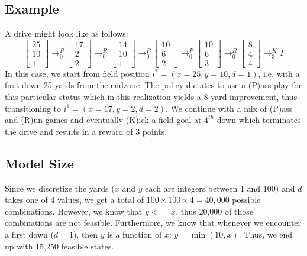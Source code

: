 \documentclass[11pt, oneside]{article}   	%
\begin{document}
\subsection{Example}
A drive might look like as follows:
$$
\begin{bmatrix} 25\\[0.3em] 10 \\[0.3em] 1 \end{bmatrix}
\longrightarrow_0^P
\begin{bmatrix} 17\\[0.3em] 2 \\[0.3em] 2 \end{bmatrix}
\longrightarrow_0^R
\begin{bmatrix} 14\\[0.3em] 10 \\[0.3em] 1 \end{bmatrix}
\longrightarrow_0^P
\begin{bmatrix} 10\\[0.3em] 6 \\[0.3em] 2 \end{bmatrix}
\longrightarrow_0^P
\begin{bmatrix} 10\\[0.3em] 6 \\[0.3em] 3 \end{bmatrix}
\longrightarrow_0^R
\begin{bmatrix} 8\\[0.3em] 4 \\[0.3em] 4 \end{bmatrix}
\longrightarrow_3^K
T
$$
In this case, we start from field position $i^* = (x=25, y=10, d=1)$, i.e. with a first-down 25 yards from the endzone. The policy dictates to use a (P)ass play for this particular status which in this realization yields a 8 yard improvement, thus transitioning to $i^1 = (x=17, y=2, d=2)$. We continue with a mix of (P)ass and (R)un games and eventually (K)ick a field-goal at $4^{th}$-down which terminates the drive and results in a reward of 3 points.

\subsection{Model Size}
Since we discretize the yards ($x$ and $y$ each are integers between 1 and 100) and $d$ takes one of 4 values, we get a total of $100 \times 100 \times 4 = 40,000$ possible combinations. However, we know that $y <= x$, thus 20,000 of those combinations are not feasible. Furthermore, we know that whenever we encounter a first down ($d=1$), then $y$ is a function of $x$: $y = \min(10,x)$. Thus, we end up with 15,250 feasible states.
\end{document}
